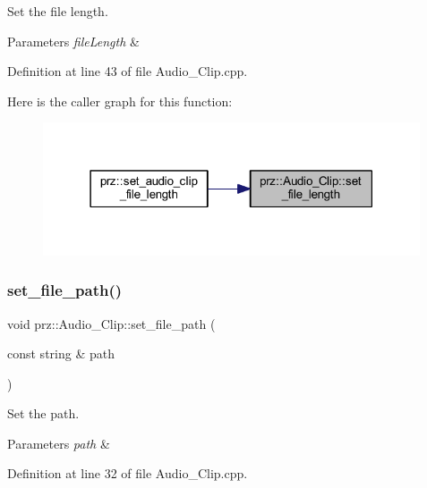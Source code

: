Set the file length. 


\begin{DoxyParams}{Parameters}
{\em file\+Length} & \\
\hline
\end{DoxyParams}


Definition at line 43 of file Audio\+\_\+\+Clip.\+cpp.

Here is the caller graph for this function\+:
\nopagebreak
\begin{figure}[H]
\begin{center}
\leavevmode
\includegraphics[width=316pt]{classprz_1_1_audio___clip_ab45f2a30cf63261040e4212af3dc08d7_icgraph}
\end{center}
\end{figure}
\mbox{\label{classprz_1_1_audio___clip_aa098aaf21788bfdf5410cb1895566391}} 
\subsubsection{\texorpdfstring{set\_file\_path()}{set\_file\_path()}}
{\footnotesize\ttfamily void prz\+::\+Audio\+\_\+\+Clip\+::set\+\_\+file\+\_\+path (\begin{DoxyParamCaption}\item[{const string \&}]{path }\end{DoxyParamCaption})}



Set the path. 


\begin{DoxyParams}{Parameters}
{\em path} & \\
\hline
\end{DoxyParams}


Definition at line 32 of file Audio\+\_\+\+Clip.\+cpp.

